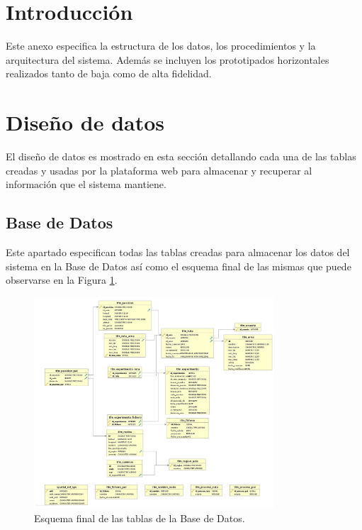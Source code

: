
\section{Introducción}

Este anexo especifica la estructura de los datos, los procedimientos y la arquitectura del sistema. Además se incluyen los prototipados horizontales realizados tanto de baja como de alta fidelidad.

\section{Diseño de datos}

El diseño de datos es mostrado en esta sección detallando cada una de las tablas creadas y usadas por la plataforma web para almacenar y recuperar al información que el sistema mantiene.

\subsection{Base de Datos}

Este apartado especifican todas las tablas creadas para almacenar los datos del sistema en la Base de Datos así como el esquema final de las mismas que puede observarse en la Figura \ref{db-schema}.

\begin{figure}[!htbp]
  \centering
    \includegraphics[width=0.8\textwidth]{../img/db/db-schema.jpg}
  \caption{Esquema final de las tablas de la Base de Datos.}
  \label{db-schema}
\end{figure}

